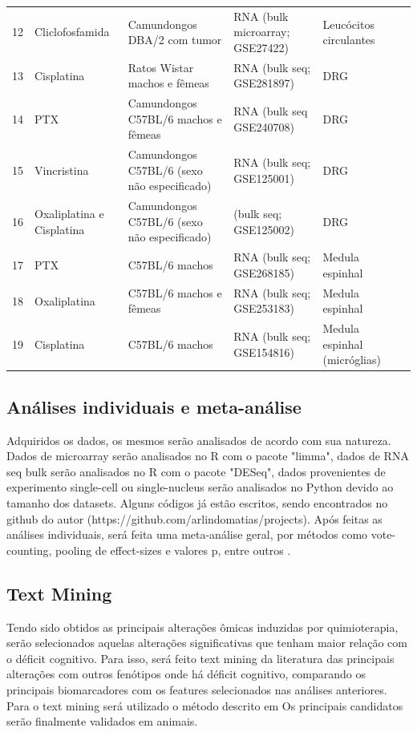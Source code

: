 \documentclass[12pt,a4paper]{article}
\begin{document}
\begin{center}
\begin{longtable}{p{0.5cm} p{2.5cm} p{3cm} p{3cm} p{2cm} p{3cm}}
		12 & Cliclofosfamida & Camundongos DBA/2 com tumor & RNA (bulk microarray; GSE27422) & Leucócitos circulantes & \cite{Ju2024} \\
		13 & Cisplatina & Ratos Wistar machos e fêmeas & RNA (bulk seq; GSE281897)  & DRG & \cite{DaVitoriaLobo2024} \\
		14 & PTX & Camundongos C57BL/6 machos e fêmeas & RNA (bulk seq GSE240708) & DRG & \cite{Naratadam2024} \\
		15 & Vincristina & Camundongos C57BL/6 (sexo não especificado) & RNA (bulk seq; GSE125001) & DRG & \cite{Starobova2020} \\
		16 & Oxaliplatina e Cisplatina & Camundongos C57BL/6 (sexo não especificado) & (bulk seq; GSE125002) & DRG & \cite{Starobova2020} \\
		17 & PTX & C57BL/6 machos & RNA (bulk seq; GSE268185)  & Medula espinhal & \cite{Sierra2025} \\
		18 & Oxaliplatina & C57BL/6 machos e fêmeas & RNA (bulk seq; GSE253183) & Medula espinhal & \cite{Wang2024c} \\
		19 & Cisplatina & C57BL/6 machos & RNA (bulk seq; GSE154816)  & Medula espinhal (micróglias) & \cite{Navia-Pelaez2021} \\
	\bottomrule
	\end{longtable}
\end{center}
	
\subsection{Análises individuais e meta-análise} \indent
	
Adquiridos os dados, os mesmos serão analisados de acordo com sua natureza. Dados de microarray serão analisados no R com o pacote "limma", dados de RNA seq bulk serão analisados no R com o pacote "DESeq", dados provenientes de experimento single-cell ou single-nucleus serão analisados no Python devido ao tamanho dos datasets. Alguns códigos já estão escritos, sendo encontrados no github do autor (https://github.com/arlindomatias/projects). Após feitas as análises individuais, será feita uma meta-análise geral, por métodos como vote-counting, pooling de effect-sizes e valores p, entre outros \cite{Mosquera2023}.
	
\subsection{Text Mining} \indent
	
Tendo sido obtidos as principais alterações ômicas induzidas por quimioterapia, serão selecionados aquelas alterações significativas que tenham maior relação com o déficit cognitivo. Para isso, será feito text mining da literatura das principais alterações com outros fenótipos onde há déficit cognitivo, comparando os principais biomarcadores com os features selecionados nas análises anteriores. Para o text mining será utilizado o método descrito em \cite{Kveler2018}
Os principais candidatos serão finalmente validados em animais. \\
	
\end{document}
